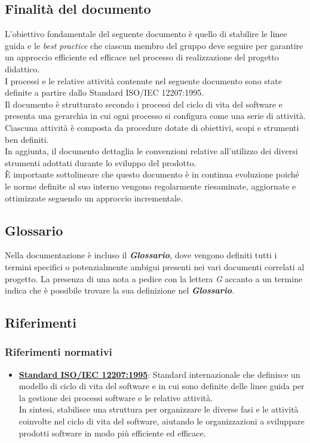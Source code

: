 \documentclass{article}
\begin{document}
\subsection{Finalità del documento}
L'obiettivo fondamentale del seguente documento è quello di stabilire le linee guida e le \textit{best practice} che ciascun membro del gruppo deve seguire per garantire un approccio efficiente ed efficace nel processo di realizzazione del progetto didattico.\\
I processi e le relative attività contenute nel seguente documento sono state definite a partire dallo Standard ISO/IEC 12207:1995.\\
Il documento è strutturato secondo i processi del ciclo di vita del software e presenta una gerarchia in cui ogni processo si configura come una serie di attività. Ciascuna attività è composta da procedure dotate di obiettivi, scopi e strumenti ben definiti.\\
In aggiunta, il documento dettaglia le convenzioni relative all'utilizzo dei diversi strumenti adottati durante lo sviluppo del prodotto.\\
È importante sottolineare che questo documento è in continua evoluzione poiché le norme definite al suo interno vengono regolarmente riesaminate, aggiornate e ottimizzate seguendo un approccio incrementale.\\

\subsection{Glossario}
Nella documentazione è incluso il \textbf{\textit{Glossario}}, dove vengono definiti tutti i termini specifici o potenzialmente ambigui presenti nei vari documenti correlati al progetto. La presenza di una nota a pedice con la lettera \textit{G} accanto a un termine indica che è possibile trovare la sua definizione nel \textbf{\textit{Glossario}}.

\subsection{Riferimenti}
\subsubsection{Riferimenti normativi}
\begin{itemize}
    \item \href{https://www.math.unipd.it/~tullio/IS-1/2009/Approfondimenti/ISO_12207-1995.pdf}{\textbf{Standard ISO/IEC 12207:1995}}:
        Standard internazionale che definisce un modello di ciclo di vita del software e in cui sono definite delle linee guida per la gestione dei processi software e le relative attività.\\
        In sintesi, stabilisce una struttura per organizzare le diverse fasi e le attività coinvolte nel ciclo di vita del software, aiutando le organizzazioni a sviluppare prodotti software in modo più efficiente ed efficace.

\end{itemize}
\end{document}
